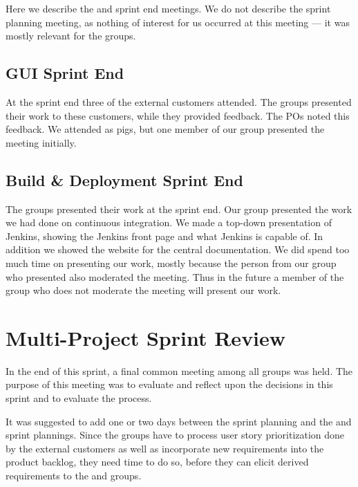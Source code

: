 Here we describe the \gui and \bd sprint end meetings. We do not describe the \db sprint planning meeting, as nothing of interest for us occurred at this meeting --- it was mostly relevant for the \gui groups.


\subsection{GUI Sprint End}
At the \gui sprint end three of the external customers attended. The \gui groups presented their work to these customers, while they provided feedback. The \gui POs noted this feedback. We attended as pigs, but one member of our group presented the meeting initially.

\subsection{Build \& Deployment Sprint End}
The \bd groups presented their work at the \bd sprint end. Our group presented the work we had done on continuous integration. We made a top-down presentation of Jenkins, showing the Jenkins front page and what Jenkins is capable of. In addition we showed the website for the central documentation. We did spend too much time on presenting our work, mostly because the person from our group who presented also moderated the meeting. Thus in the future a member of the group who does not moderate the meeting will present our work.

\section{Multi-Project Sprint Review}
In the end of this sprint, a final common meeting among all groups was held. The purpose of this meeting was to evaluate and reflect upon the decisions in this sprint and to evaluate the process.

It was suggested to add one or two days between the \gui sprint planning and the \db and \bd sprint plannings. Since the \gui groups have to process user story prioritization done by the external customers as well as incorporate new requirements into the product backlog, they need time to do so, before they can elicit derived requirements to the \db and \bd groups. 


